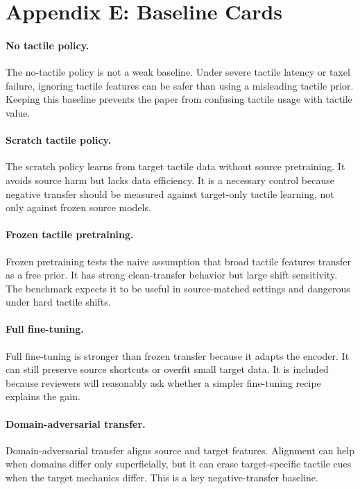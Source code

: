 \documentclass{article}
\begin{document}
\clearpage
\section{Appendix E: Baseline Cards}
\paragraph{No tactile policy.}
The no-tactile policy is not a weak baseline. Under severe tactile latency or taxel failure, ignoring tactile features can be safer than using a misleading tactile prior. Keeping this baseline prevents the paper from confusing tactile usage with tactile value.

\paragraph{Scratch tactile policy.}
The scratch policy learns from target tactile data without source pretraining. It avoids source harm but lacks data efficiency. It is a necessary control because negative transfer should be measured against target-only tactile learning, not only against frozen source models.

\paragraph{Frozen tactile pretraining.}
Frozen pretraining tests the naive assumption that broad tactile features transfer as a free prior. It has strong clean-transfer behavior but large shift sensitivity. The benchmark expects it to be useful in source-matched settings and dangerous under hard tactile shifts.

\paragraph{Full fine-tuning.}
Full fine-tuning is stronger than frozen transfer because it adapts the encoder. It can still preserve source shortcuts or overfit small target data. It is included because reviewers will reasonably ask whether a simpler fine-tuning recipe explains the gain.

\paragraph{Domain-adversarial transfer.}
Domain-adversarial transfer aligns source and target features. Alignment can help when domains differ only superficially, but it can erase target-specific tactile cues when the target mechanics differ. This is a key negative-transfer baseline.
\end{document}
